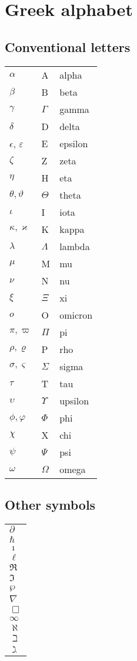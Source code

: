 \chapter{Greek alphabet}

\section{Conventional letters}
\begin{longtable}{l| l| l}
    $\alpha$ & A & alpha \\
    $\beta$ & B & beta \\
    $\gamma$ & $\Gamma$  & gamma \\
    $\delta$ & D  & delta \\
    $\epsilon$, $\varepsilon$ & E & epsilon \\
    $\zeta$ & Z & zeta \\
    $\eta$ & H & eta \\
    $\theta, \vartheta$ & $\Theta$ & theta \\
    $\iota$ & I & iota \\
    $\kappa, \varkappa$ & K & kappa \\
    $\lambda$ & $\Lambda$ & lambda \\
    $\mu$ & M & mu \\
    $\nu$ & N & nu \\
    $\xi$ & $\Xi$ & xi \\
    $o$ & O & omicron \\
    $\pi, \varpi$ & $\Pi$ & pi \\
    $\rho, \varrho $ & P & rho \\
    $\sigma, \varsigma$ & $\Sigma$ & sigma \\
    $\tau$ & T & tau \\
    $\upsilon$ & $\Upsilon$ & upsilon \\
    $\phi, \varphi$ & $\Phi$ & phi \\
    $\chi$ & X & chi \\
    $\psi$ & $\Psi$ & psi \\
    $\omega$ & $\Omega$ & omega \\
\end{longtable}

\section{Other symbols}
\begin{longtable}{l}
    $\partial$ \\
    $\hbar$ \\
    $\imath$ \\
    $\ell$ \\
    $\Re$ \\
    $\Im$ \\
    $\wp$ \\
    $\nabla$ \\
    $\Box$ \\
    $\infty$ \\
    $\aleph$ \\
    $\beth$ \\
    $\gimel$ \\

\end{longtable}
